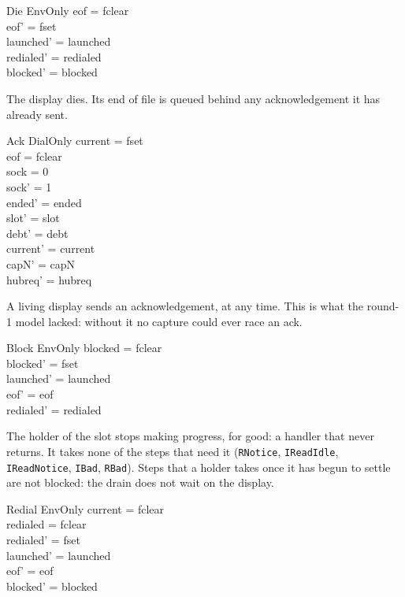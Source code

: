 \documentclass[a4paper,10pt,fleqn]{article}
\begin{document}
\begin{schema}{Die}
  EnvOnly
\where
  eof = fclear \\
  eof' = fset \\
  launched' = launched \\
  redialed' = redialed \\
  blocked' = blocked
\end{schema}

The display dies.  Its end of file is queued behind any acknowledgement it has
already sent.

\begin{schema}{Ack}
  DialOnly
\where
  current = fset \\
  eof = fclear \\
  sock = 0 \\
  sock' = 1 \\
  ended' = ended \\
  slot' = slot \\
  debt' = debt \\
  current' = current \\
  capN' = capN \\
  hubreq' = hubreq
\end{schema}

A living display sends an acknowledgement, at any time.  This is what the round-1
model lacked: without it no capture could ever race an ack.

\begin{schema}{Block}
  EnvOnly
\where
  blocked = fclear \\
  blocked' = fset \\
  launched' = launched \\
  eof' = eof \\
  redialed' = redialed
\end{schema}

The holder of the slot stops making progress, for good: a handler that never
returns.  It takes none of the steps that need it (\texttt{RNotice},
\texttt{IReadIdle}, \texttt{IReadNotice}, \texttt{IBad}, \texttt{RBad}).  Steps
that a holder takes once it has begun to settle are not blocked: the drain does
not wait on the display.

\begin{schema}{Redial}
  EnvOnly
\where
  current = fclear \\
  redialed = fclear \\
  redialed' = fset \\
  launched' = launched \\
  eof' = eof \\
  blocked' = blocked
\end{schema}
\end{document}

